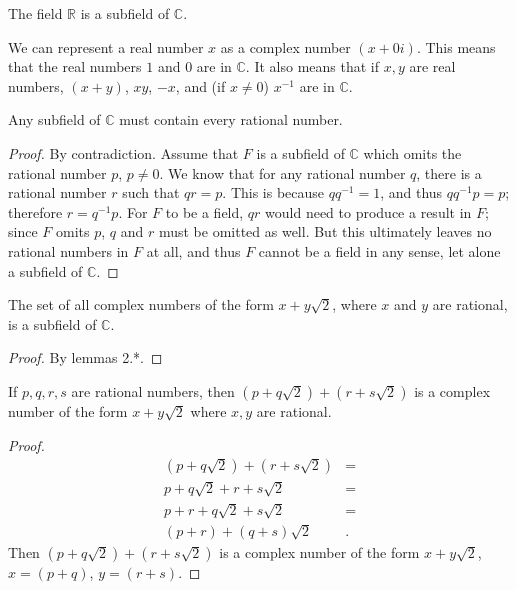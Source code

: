\documentclass[12pt]{article}
\begin{document}
\begin{exm}
  The field $\mathbb{R}$ is a subfield of $\mathbb{C}$.

  We can represent a real number $x$ as a complex number $(x +
  0i)$. This means that the real numbers $1$ and $0$ are in
  $\mathbb{C}$. It also means that if $x, y$ are real numbers,
  $(x + y)$, $xy$, $-x$, and (if $x \neq 0$) $x^{-1}$ are in
  $\mathbb{C}$.
\end{exm}

\begin{thm}
  Any subfield of $\mathbb{C}$ must contain every rational
  number.
  \begin{proof}
    By contradiction. Assume that $F$ is a subfield of
    $\mathbb{C}$ which omits the rational number $p$, $p \neq 0$.
    We know that for any rational number $q$, there is a rational
    number $r$ such that $qr = p$. This is because $qq^{-1} = 1$,
    and thus $qq^{-1}p = p$; therefore $r = q^{-1}p$. For $F$ to
    be a field, $qr$ would need to produce a result in $F$; since
    $F$ omits $p$, $q$ and $r$ must be omitted as well. But this
    ultimately leaves no rational numbers in $F$ at all, and thus
    $F$ cannot be a field in any sense, let alone a subfield of
    $\mathbb{C}$.
  \end{proof}
\end{thm}

\begin{thm}
  The set of all complex numbers of the form $x + y\sqrt{2}$,
  where $x$ and $y$ are rational, is a subfield of $\mathbb{C}$.

  \begin{proof}
    By lemmas 2.*.
  \end{proof}
\end{thm}

\begin{lemma}
  If $p,q,r,s$ are rational numbers, then $(p + q\sqrt{2}) + (r
  + s\sqrt{2})$ is a complex number of the form $x +
  y\sqrt{2}$ where $x, y$ are rational.
  \begin{proof}
    \begin{align*}
      (p + q\sqrt{2}) + (r + s\sqrt{2}) &=\\
      p + q\sqrt{2} + r + s\sqrt{2} &=\\
      p + r + q\sqrt{2} + s\sqrt{2} &=\\
      (p + r) + (q + s)\sqrt{2}&.
    \end{align*}
    Then $(p + q\sqrt{2}) + (r + s\sqrt{2})$ is a complex number
    of the form $x + y\sqrt{2}$, $x = (p + q)$, $y = (r + s)$.
  \end{proof}
\end{lemma}
\end{document}
